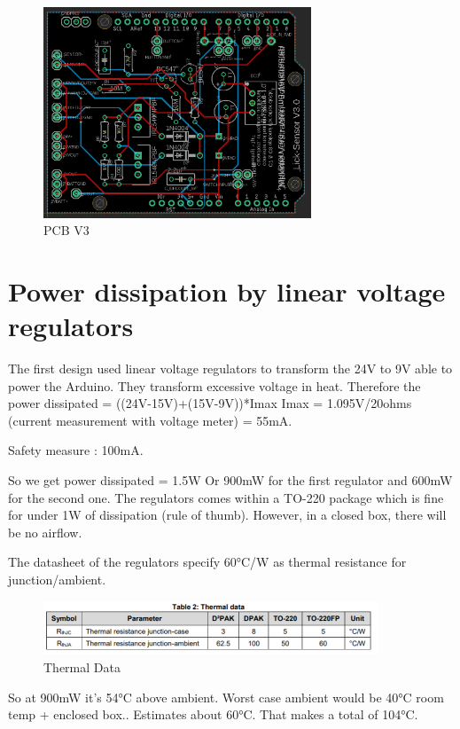 \documentclass[a4paper]{article}
\begin{document}
\begin{figure}[h!t!b!]
    \centering
    \includegraphics[width = 8cm]{images/BoardViewV3.PNG}
    \caption{PCB V3}
    \label{fig:PCBV3}
\end{figure}


\appendix
\section{Power dissipation by linear voltage regulators}
The first design used linear voltage regulators to transform the 24V to 9V able to power the Arduino.
They transform excessive voltage in heat.
Therefore the power dissipated = ((24V-15V)+(15V-9V))*Imax
Imax =  1.095V/20ohms (current measurement with voltage meter) = 55mA.

Safety measure : 100mA.

So we get power dissipated = 1.5W
Or 900mW for the first regulator and 600mW for the second one.
The regulators comes within a TO-220 package which is fine for under 1W of dissipation (rule of thumb). However, in a closed box, there will be no airflow.

The datasheet of the regulators specify 60°C/W as thermal resistance for junction/ambient.

\begin{figure}[h!]
    \centering
    \includegraphics[width = 10cm]{images/thermalData.png}
    \caption{Thermal Data}
    \label{fig:thermalData}
\end{figure}

So at 900mW it's 54°C above ambient. Worst case ambient would be 40°C room temp + enclosed box.. Estimates about 60°C. That makes a total of 104°C.
\end{document}
